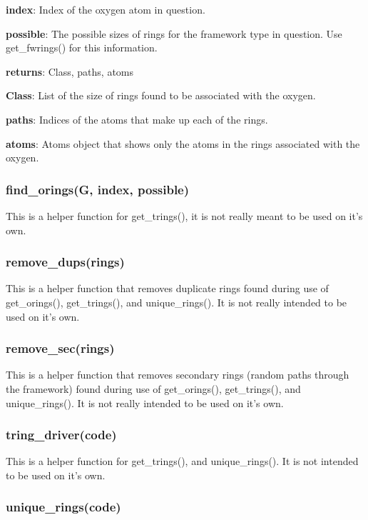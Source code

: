 \documentclass[11pt]{article}
\begin{document}
\textbf{index}: Index of the oxygen atom in question.

\textbf{possible}: The possible sizes of rings for the framework type in question. Use get\_fwrings() for this information.

\textbf{returns}: Class, paths, atoms

\textbf{Class}: List of the size of rings found to be associated with the oxygen.

\textbf{paths}: Indices of the atoms that make up each of the rings.

\textbf{atoms}: Atoms object that shows only the atoms in the rings associated with the oxygen.


\subsubsection{find\_orings(G, index, possible)}
\label{sec:org4258a47}

This is a helper function for get\_trings(), it is not really meant to be used on it's own. 

\subsubsection{remove\_dups(rings)}
\label{sec:orgb3e574a}

This is a helper function that removes duplicate rings found during use of get\_orings(), get\_trings(), and unique\_rings(). It is not really intended to be used on it's own.


\subsubsection{remove\_sec(rings)}
\label{sec:org88409a0}

This is a helper function that removes secondary rings (random paths through the framework) found during use of get\_orings(), get\_trings(), and unique\_rings(). It is not really intended to be used on it's own.


\subsubsection{tring\_driver(code)}
\label{sec:org0e64a8b}

This is a helper function for get\_trings(), and unique\_rings(). It is not intended to be used on it's own. 

\subsubsection{unique\_rings(code)}
\label{sec:org05c0cff}
\end{document}

